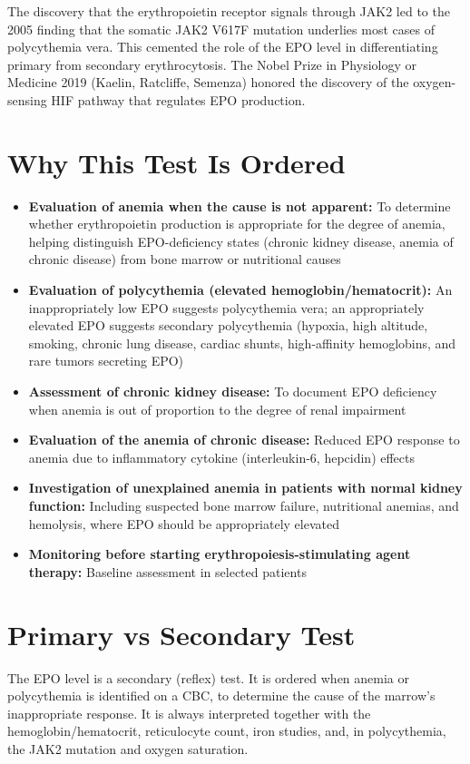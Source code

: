 The discovery that the erythropoietin receptor signals through JAK2 led to the 2005 finding that the somatic JAK2 V617F mutation underlies most cases of polycythemia vera. This cemented the role of the EPO level in differentiating primary from secondary erythrocytosis. The Nobel Prize in Physiology or Medicine 2019 (Kaelin, Ratcliffe, Semenza) honored the discovery of the oxygen-sensing HIF pathway that regulates EPO production.

\section*{Why This Test Is Ordered}
\begin{itemize}
  \item \textbf{Evaluation of anemia when the cause is not apparent:} To determine whether erythropoietin production is appropriate for the degree of anemia, helping distinguish EPO-deficiency states (chronic kidney disease, anemia of chronic disease) from bone marrow or nutritional causes
  \item \textbf{Evaluation of polycythemia (elevated hemoglobin/hematocrit):} An inappropriately low EPO suggests polycythemia vera; an appropriately elevated EPO suggests secondary polycythemia (hypoxia, high altitude, smoking, chronic lung disease, cardiac shunts, high-affinity hemoglobins, and rare tumors secreting EPO)
  \item \textbf{Assessment of chronic kidney disease:} To document EPO deficiency when anemia is out of proportion to the degree of renal impairment \cite{kdoqi2007kdoqi}
  \item \textbf{Evaluation of the anemia of chronic disease:} Reduced EPO response to anemia due to inflammatory cytokine (interleukin-6, hepcidin) effects
  \item \textbf{Investigation of unexplained anemia in patients with normal kidney function:} Including suspected bone marrow failure, nutritional anemias, and hemolysis, where EPO should be appropriately elevated
  \item \textbf{Monitoring before starting erythropoiesis-stimulating agent therapy:} Baseline assessment in selected patients
\end{itemize}

\section*{Primary vs Secondary Test}
The EPO level is a secondary (reflex) test. It is ordered when anemia or polycythemia is identified on a CBC, to determine the cause of the marrow's inappropriate response. It is always interpreted together with the hemoglobin/hematocrit, reticulocyte count, iron studies, and, in polycythemia, the JAK2 mutation and oxygen saturation.

